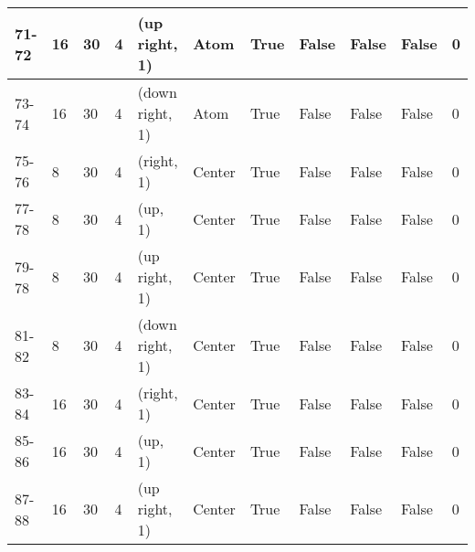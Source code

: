 \begin{longtable}{|C{0.9cm}|C{0.8cm}|C{0.8cm}|C{0.8cm}|C{3cm}|C{1.5cm}|C{1.5cm}|C{0.8cm}|C{0.8cm}|C{1cm}|C{1cm}|}
    71-72 &  16 &  30 &  4 & (up right, 1) & Atom & True & False & False & False & 0 \\ \hline

    73-74 &  16 &  30 &  4 & (down right, 1) & Atom & True & False & False & False & 0 \\ \hline
    
    
    75-76 &  8 &  30 &  4 & (right, 1) & Center & True & False & False & False & 0 \\ \hline

    77-78 &  8 &  30 &  4 & (up, 1) & Center & True & False & False & False & 0 \\ \hline

    79-78 &  8 &  30 &  4 & (up right, 1) & Center & True & False & False & False & 0 \\ \hline

    81-82 &  8 &  30 &  4 & (down right, 1) & Center & True & False & False & False & 0 \\ \hline

    83-84 &  16 &  30 &  4 & (right, 1) & Center & True & False & False & False & 0 \\ \hline

    85-86 &  16 &  30 &  4 & (up, 1) & Center & True & False & False & False & 0 \\ \hline

    87-88 &  16 &  30 &  4 & (up right, 1) & Center & True & False & False & False & 0 \\ \hline


\end{longtable}
